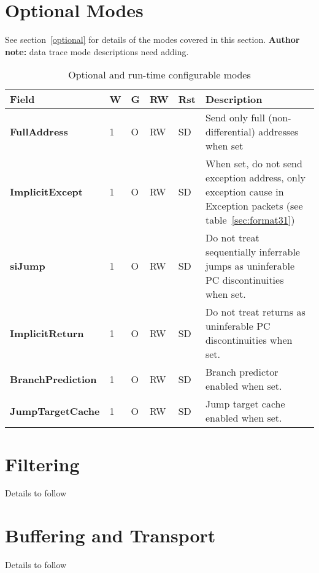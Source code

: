 \FloatBarrier
\section{Optional Modes} \label{sec:ctl-modes}

See section~\ref{optional} for details of the modes covered in this section.  \textbf{Author note:} data trace mode descriptions need adding.

\begin{table}[htp]
  \centering
  \caption{Optional and run-time configurable modes}
  \label{tab:ctl-resync}
  \begin{tabulary}{\textwidth}{|l|l|l|l|l|p{90mm}|}
    \hline
    {\bf Field} & {\bf W} & {\bf G} & {\bf RW} & {\bf Rst} & {\bf Description} \\
    \hline
    \textbf{FullAddress} & 1 & O & RW & SD & Send only full (non-differential) addresses when set\\
    \hline
    \textbf{ImplicitExcept} & 1 & O & RW & SD & When set, do not send exception address, only exception cause in 
      Exception packets (see table~\ref{sec:format31})\\
    \hline
    \textbf{siJump} & 1 & O & RW & SD & Do not treat sequentially inferrable jumps as uninferable PC discontinuities when set.\\
    \hline
    \textbf{ImplicitReturn} & 1 & O & RW & SD & Do not treat returns as uninferable PC discontinuities when set.\\
    \hline
    \textbf{BranchPrediction} & 1 & O & RW & SD & Branch predictor enabled when set.\\
    \hline
    \textbf{JumpTargetCache} & 1 & O & RW & SD & Jump target cache enabled when set.\\
    \hline
  \end{tabulary}
\end{table}


\section{Filtering} \label{sec:ctl-filter}

Details to follow

\section{Buffering and Transport} \label{sec:ctl-transport}

Details to follow

